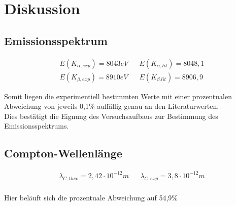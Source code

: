 \section{Diskussion}
\label{sec:Diskussion}

\subsection{Emissionsspektrum}
\label{subsec:disk_emission}

\begin{align*}
   
    E(K_{\alpha,exp}) = 8043 eV &&  E(K_{\alpha,lit}) = 8048,1 \\
    E(K_{\beta,exp}) = 8910 eV  &&  E(K_{\beta.lit}) = 8906,9
\end{align*}

Somit liegen die experimentiell bestimmten Werte mit einer prozentualen Abweichung von jeweils 0,1\% auffällig
genau an den Literaturwerten. \\
Dies bestätigt die Eignung des Versuchsaufbaus zur Bestimmung des Emissionsspektrums.\\






\subsection{Compton-Wellenlänge}
\label{subsec:disk_compton}

\begin{align*}
    \lambda_{C, theo} = 2,42 \cdot 10^{-12}m && \lambda_{C, exp} = 3,8 \cdot 10^{-12}m \\
\end{align*}

Hier beläuft sich die prozentuale Abweichung auf 54,9\% 
